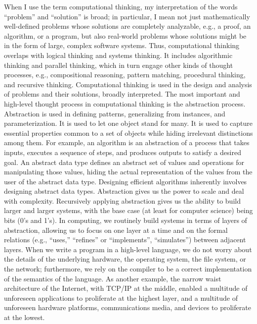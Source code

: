 \documentclass{book}
\begin{document}
When I use the term computational thinking, my interpretation of the words “problem” and “solution” is broad; in particular, I mean not just mathematically well-defined problems whose solutions are completely analyzable, e.g., a proof, an algorithm, or a program, but also real-world problems whose solutions might be in the form of large, complex software systems. Thus, computational thinking overlaps with logical thinking and systems thinking. It includes algorithmic thinking and parallel thinking, which in turn engage other kinds of thought processes, e.g., compositional reasoning, pattern matching, procedural thinking, and recursive thinking.
Computational thinking is used in the design and analysis of problems and their solutions, broadly interpreted. The most important and high-level thought process in computational thinking is the abstraction process. Abstraction is used in defining patterns, generalizing from instances, and parameterization. It is used to let one object stand for many. It is used to capture essential properties common to a set of objects while hiding irrelevant distinctions among them. For example, an algorithm is an abstraction of a process that takes inputs, executes a sequence of steps, and produces outputs to satisfy a desired goal. An abstract data type defines an abstract set of values and operations for manipulating those values, hiding the actual representation of the values from the user of the abstract data type. Designing efficient algorithms inherently involves designing abstract data types. Abstraction gives us the power to scale and deal with complexity.
Recursively applying abstraction gives us the ability to build larger and larger systems, with the base case (at least for computer science) being bits (0’s and 1’s). In computing, we routinely build systems in terms of layers of abstraction, allowing us to focus on one layer at a time and on the formal relations (e.g., “uses,” “refines” or “implements”, “simulates”) between adjacent layers. When we write a program in a high-level language, we do not worry about the details of the underlying hardware, the operating system, the file system, or the network; furthermore, we rely on the compiler to be a correct implementation of the semantics of the language. As another example, the narrow waist architecture of the Internet, with TCP/IP at the middle, enabled a multitude of unforeseen applications to proliferate at the highest layer, and a multitude of unforeseen hardware platforms, communications media, and devices to proliferate at the lowest.
\end{document}
